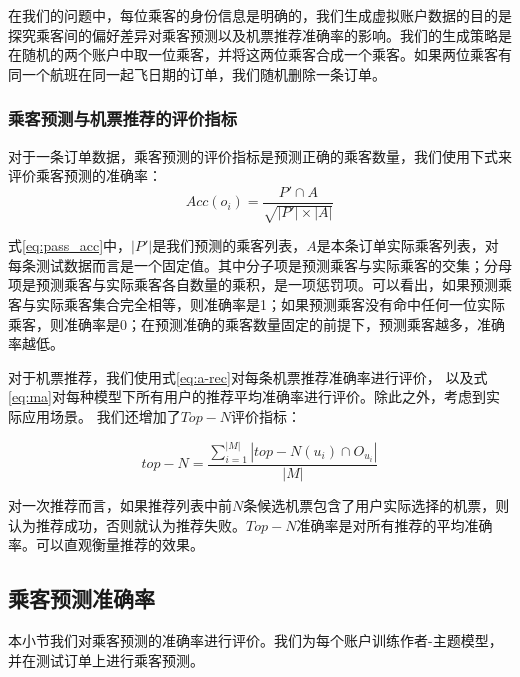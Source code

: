 在我们的问题中，每位乘客的身份信息是明确的，我们生成虚拟账户数据的目的是探究乘客间的偏好差异对乘客预测以及机票推荐准确率的影响。我们的生成策略是在随机的两个账户中取一位乘客，并将这两位乘客合成一个乘客。如果两位乘客有同一个航班在同一起飞日期的订单，我们随机删除一条订单。

\subsubsection{乘客预测与机票推荐的评价指标}

对于一条订单数据，乘客预测的评价指标是预测正确的乘客数量，我们使用下式来评价乘客预测的准确率：
\begin{equation}
\label{eq:pass_acc}
Acc(o_i) = \frac{P' \cap A}{\sqrt{|P'| \times |A|}}
\end{equation}

式\ref{eq:pass_acc}中，$|P'|$是我们预测的乘客列表，$A$是本条订单实际乘客列表，对每条测试数据而言是一个固定值。其中分子项是预测乘客与实际乘客的交集；分母项是预测乘客与实际乘客各自数量的乘积，是一项惩罚项。可以看出，如果预测乘客与实际乘客集合完全相等，则准确率是1；如果预测乘客没有命中任何一位实际乘客，则准确率是0；在预测准确的乘客数量固定的前提下，预测乘客越多，准确率越低。

对于机票推荐，我们使用式\ref{eq:a-rec}对每条机票推荐准确率进行评价，
以及式\ref{eq:ma}对每种模型下所有用户的推荐平均准确率进行评价。除此之外，考虑到实际应用场景。
我们还增加了$Top-N$评价指标：

\begin{equation}
\label{eq:topn}
top-N = \frac{\sum_{i=1}^{|M|}|top-N(u_i) \cap O_{u_i}|}{|M|}
\end{equation}

对一次推荐而言，如果推荐列表中前$N$条候选机票包含了用户实际选择的机票，则认为推荐成功，否则就认为推荐失败。$Top-N$准确率是对所有推荐的平均准确率。可以直观衡量推荐的效果。


\subsection{乘客预测准确率}
本小节我们对乘客预测的准确率进行评价。我们为每个账户训练作者-主题模型，并在测试订单上进行乘客预测。
\begin{figure}
\centering
{}
\end{figure}

